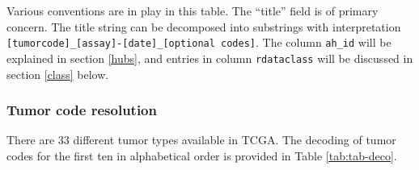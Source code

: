 Various conventions are in play in this table. The ``title'' field is
of primary concern. The title string can be decomposed into
substrings with interpretation
\texttt{{[}tumorcode{]}\_{[}assay{]}-{[}date{]}\_{[}optional codes{]}}. The column \texttt{ah\_id} will be
explained in section \ref{hubs}, and entries in column
\texttt{rdataclass} will be discussed in section \ref{class} below.

\hypertarget{tumor-code-resolution}{%
\subsubsection{Tumor code resolution}\label{tumor-code-resolution}}

There are 33 different tumor types available in TCGA. The
decoding of tumor codes for the first ten in alphabetical order is
provided in Table \ref{tab:tab-deco}.

